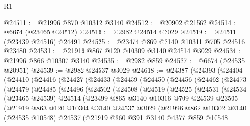 \begin{lexlean}{R1}
\begin{coremodule}
@24511 := @21996 @870 @10312 @3140
@24512 := @20902 @21562
@24514 := @6674 (@23465 @24512)
@24516 := @2982 @24514 @3029
@24519 := @24511 (@23439 @24516) @24491
@24525 := @23474 @869 @3140 @10311 @705 @24516 @23480
@24531 := @21919 @867 @120 @10309 @3140 @24514 @3029
@24534 := @21996 @866 @10307 @3140
@24535 := @2982 @859
@24537 := @6674 (@24535 @20951)
@24539 := @2982 @24537 @3029
@24618 := @24387
    (@24393
      (@24404
        (@24410
          (@24416
            (@24427
              (@24433
                (@24439
                  (@24450
                    (@24456
                      (@24462
                        (@24473
                          (@24479
                            (@24485
                              (@24496
                                (@24502
                                  (@24508
                                    (@24519
                                      (@24525
                                        (@24531
                                          (@24534
                                            (@23465 @24539)
                                            @24514
                                            (@23499
                                              @865
                                              @3140
                                              @10306
                                              @709
                                              @24539
                                              @23505
                                              (@21919
                                                @863
                                                @120
                                                @10304
                                                @3140
                                                @24537
                                                @3029
                                                (@21996
                                                  @862
                                                  @10302
                                                  @3140
                                                  (@24535 @10548)
                                                  @24537
                                                  (@21919
                                                    @860
                                                    @391
                                                    @3140
                                                    @4377
                                                    @859
                                                    @10548

\end{coremodule}
\end{lexlean}
